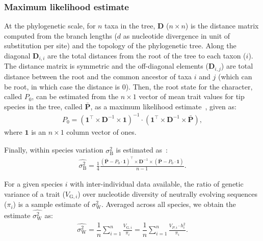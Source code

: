 \documentclass{article}
\newcommand{\Multiply}{\cdot}
\newcommand{\MultiplyMatrix}{\times}
\newcommand{\UniDimArray}[1]{\bm{#1}}
\newcommand{\BiDimArray}[1]{\bm{#1}}
\newcommand{\tr}{^{\intercal}}
\newcommand{\inv}{^{-1}}
\newcommand{\Spi}{i}
\newcommand{\Spj}{j}
\newcommand{\NbrTaxa}{n}
\newcommand{\Trait}{P}
\newcommand{\Heritability}{h^2}
\newcommand{\VecTrait}{\UniDimArray{\bar{\Trait}}}
\newcommand{\Root}{0}
\newcommand{\RootTrait}{\Trait_{\Root}}
\newcommand{\VecOne}{\UniDimArray{1}}
\newcommand{\Distance}{\BiDimArray{D}}
\newcommand{\DistanceMatrix}{\BiDimArray{\Distance}}
\newcommand{\VarGeneticSpi}{V_{\mathrm{G}, \Spi}}
\newcommand{\RateBetween}{\sigma^2_{\mathrm{B}}}
\newcommand{\RateWhithin}{\sigma^2_{\mathrm{W}}}
\newcommand{\EstRateBetween}{\widehat{\RateBetween}}
\newcommand{\EstRateWhithin}{\widehat{\RateWhithin}}
\begin{document}
\subsubsection*{Maximum likelihood estimate}
At the phylogenetic scale, for $\NbrTaxa$ taxa in the tree, $\DistanceMatrix$ ($\NbrTaxa \times \NbrTaxa$) is the distance matrix computed from the branch lengths ($d$ as nucleotide divergence in unit of substitution per site) and the topology of the phylogenetic tree.
Along the diagonal $\Distance_{\Spi,\Spi}$ are the total distances from the root of the tree to each taxon ($\Spi$).
The distance matrix is symmetric and the off-diagonal elements ($\Distance_{\Spi,\Spj}$) are total distance between the root and the common ancestor of taxa $\Spi$ and $\Spj$ (which can be root, in which case the distance is 0).
Then, the root state for the character, called $\RootTrait$, can be estimated from the $\NbrTaxa \times 1$ vector of mean trait values for tip species in the tree, called $\VecTrait$, as a maximum likelihood estimate~\cite{omeara_testing_2006}, given as:
\begin{gather}
    \RootTrait = \left( \VecOne\tr \MultiplyMatrix \DistanceMatrix\inv \MultiplyMatrix \VecOne \right)\inv \Multiply \left( \VecOne\tr \MultiplyMatrix \DistanceMatrix\inv \MultiplyMatrix \VecTrait \right), \label{eq:estimated-root-trait}
\end{gather}
where $\VecOne$ is an $\NbrTaxa \times 1$ column vector of ones.

Finally, within species variation $\EstRateBetween$ is estimated as~\cite{omeara_testing_2006}:
\begin{gather}
    \EstRateBetween = \frac{1}{4}\frac{\left( \VecTrait -  \RootTrait \Multiply \VecOne \right)\tr \MultiplyMatrix \DistanceMatrix\inv \MultiplyMatrix \left( \VecTrait -  \RootTrait \Multiply \VecOne  \right)}{\NbrTaxa - 1}. \label{eq:estimated-rate-phy}
\end{gather}

For a given species $\Spi$ with inter-individual data available, the ratio of genetic variance of a trait ($\VarGeneticSpi$) over nucleotide diversity of neutrally evolving sequences ($\pi_{\Spi}$) is a sample estimate of $\RateWhithin$.
Averaged across all species, we obtain the estimate $\EstRateWhithin$ as:
\begin{gather}
    \EstRateWhithin = \dfrac{1}{\NbrTaxa}\sum_{i=1}^{\NbrTaxa}\frac{  \VarGeneticSpi}{ \pi_{i}} = \dfrac{1}{\NbrTaxa}\sum_{i=1}^{\NbrTaxa} \frac{  V_{\Trait, i} \Multiply \Heritability_{i}}{ \pi_{i}}. \label{eq:estimated-rate-pop}
\end{gather}
\end{document}
